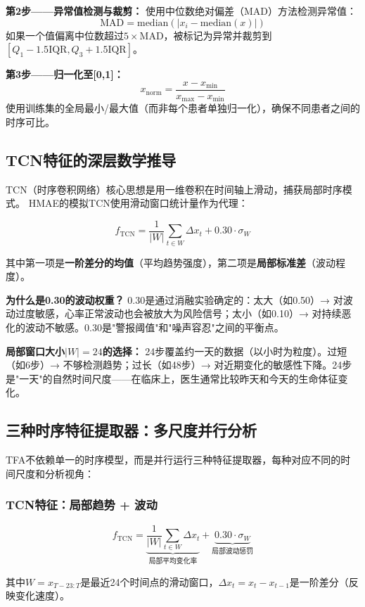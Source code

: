 \documentclass[11pt,a4paper]{ctexart}
\begin{document}
\textbf{第2步——异常值检测与裁剪：}
使用中位数绝对偏差（MAD）方法检测异常值：
$$\text{MAD} = \text{median}(|x_i - \text{median}(x)|)$$
如果一个值偏离中位数超过$5 \times \text{MAD}$，被标记为异常并裁剪到$[Q_1 - 1.5\text{IQR}, Q_3 + 1.5\text{IQR}]$。

\textbf{第3步——归一化至[0,1]：}
$$x_{\text{norm}} = \frac{x - x_{\min}}{x_{\max} - x_{\min}}$$
使用训练集的全局最小/最大值（而非每个患者单独归一化），确保不同患者之间的时序可比。

\subsection{TCN特征的深层数学推导}

TCN（时序卷积网络）核心思想是用一维卷积在时间轴上滑动，捕获局部时序模式。
HMAE的模拟TCN使用滑动窗口统计量作为代理：

$$f_{\text{TCN}} = \frac{1}{|W|}\sum_{t \in W} \Delta x_t + 0.30 \cdot \sigma_W$$

其中第一项是\textbf{一阶差分的均值}（平均趋势强度），第二项是\textbf{局部标准差}（波动程度）。

\textbf{为什么是0.30的波动权重？} 0.30是通过消融实验确定的：太大（如0.50）→ 对波动过度敏感，心率正常波动也会被放大为风险信号；太小（如0.10）→ 对持续恶化的波动不敏感。0.30是"警报阈值"和"噪声容忍"之间的平衡点。

\textbf{局部窗口大小$|W|=24$的选择：} 24步覆盖约一天的数据（以小时为粒度）。过短（如6步）→ 不够检测趋势；过长（如48步）→ 对近期变化的敏感性下降。24步是"一天"的自然时间尺度——在临床上，医生通常比较昨天和今天的生命体征变化。



\subsection{三种时序特征提取器：多尺度并行分析}

TFA不依赖单一的时序模型，而是并行运行三种特征提取器，每种对应不同的时间尺度和分析视角：

\subsubsection{TCN特征：局部趋势 + 波动}

$$f_{\text{TCN}} = \underbrace{\frac{1}{|W|}\sum_{t \in W} \Delta x_t}_{\text{局部平均变化率}} + \underbrace{0.30 \cdot \sigma_W}_{\text{局部波动惩罚}}$$

其中$W = x_{T-23:T}$是最近24个时间点的滑动窗口，$\Delta x_t = x_t - x_{t-1}$是一阶差分（反映变化速度）。
\end{document}
